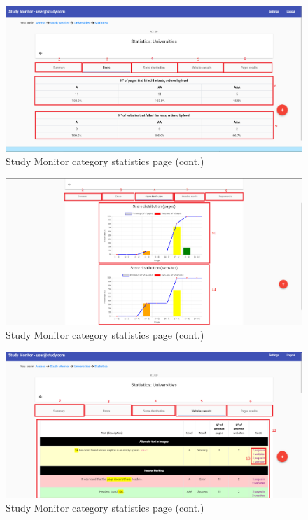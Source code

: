 \clearpage

\begin{figure}[H]
    \centering
    \includegraphics[width=\linewidth]{lib/images/study/study_category_statistics_2.png}
    \caption{Study Monitor category statistics page (cont.)}
    \label{fig:study_category_statistics_page_2}
\end{figure}

\begin{figure}[H]
    \centering
    \includegraphics[width=\linewidth]{lib/images/study/study_category_statistics_3.png}
    \caption{Study Monitor category statistics page (cont.)}
    \label{fig:study_category_statistics_page_3}
\end{figure}

\begin{figure}[H]
    \centering
    \includegraphics[width=\linewidth]{lib/images/study/study_category_statistics_4.png}
    \caption{Study Monitor category statistics page (cont.)}
    \label{fig:study_category_statistics_page_4}
\end{figure}

